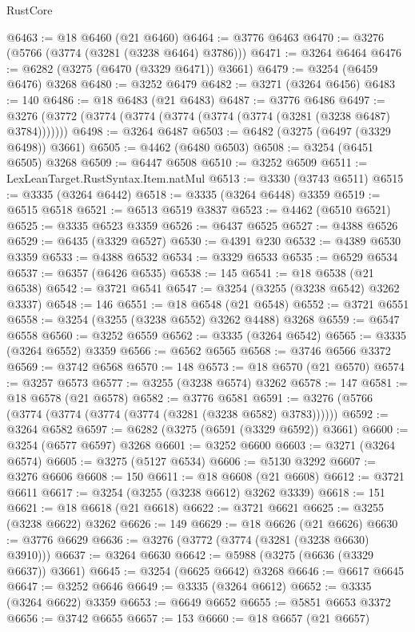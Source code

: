 \begin{lexlean}{RustCore}
\begin{coremodule}
@6463 := @18 @6460 (@21 @6460)
@6464 := @3776 @6463
@6470 := @3276 (@5766 (@3774 (@3281 (@3238 @6464) @3786)))
@6471 := @3264 @6464
@6476 := @6282 (@3275 (@6470 (@3329 @6471)) @3661)
@6479 := @3254 (@6459 @6476) @3268
@6480 := @3252 @6479
@6482 := @3271 (@3264 @6456)
@6483 := 140
@6486 := @18 @6483 (@21 @6483)
@6487 := @3776 @6486
@6497 := @3276 (@3772 (@3774 (@3774 (@3774 (@3774 (@3774 (@3281 (@3238 @6487) @3784)))))))
@6498 := @3264 @6487
@6503 := @6482 (@3275 (@6497 (@3329 @6498)) @3661)
@6505 := @4462 (@6480 @6503)
@6508 := @3254 (@6451 @6505) @3268
@6509 := @6447 @6508
@6510 := @3252 @6509
@6511 := LexLeanTarget.RustSyntax.Item.natMul
@6513 := @3330 (@3743 @6511)
@6515 := @3335 (@3264 @6442)
@6518 := @3335 (@3264 @6448) @3359
@6519 := @6515 @6518
@6521 := @6513 @6519 @3837
@6523 := @4462 (@6510 @6521)
@6525 := @3335 @6523 @3359
@6526 := @6437 @6525
@6527 := @4388 @6526
@6529 := @6435 (@3329 @6527)
@6530 := @4391 @230
@6532 := @4389 @6530 @3359
@6533 := @4388 @6532
@6534 := @3329 @6533
@6535 := @6529 @6534
@6537 := @6357 (@6426 @6535)
@6538 := 145
@6541 := @18 @6538 (@21 @6538)
@6542 := @3721 @6541
@6547 := @3254 (@3255 (@3238 @6542) @3262 @3337)
@6548 := 146
@6551 := @18 @6548 (@21 @6548)
@6552 := @3721 @6551
@6558 := @3254 (@3255 (@3238 @6552) @3262 @4488) @3268
@6559 := @6547 @6558
@6560 := @3252 @6559
@6562 := @3335 (@3264 @6542)
@6565 := @3335 (@3264 @6552) @3359
@6566 := @6562 @6565
@6568 := @3746 @6566 @3372
@6569 := @3742 @6568
@6570 := 148
@6573 := @18 @6570 (@21 @6570)
@6574 := @3257 @6573
@6577 := @3255 (@3238 @6574) @3262
@6578 := 147
@6581 := @18 @6578 (@21 @6578)
@6582 := @3776 @6581
@6591 := @3276 (@5766 (@3774 (@3774 (@3774 (@3774 (@3281 (@3238 @6582) @3783))))))
@6592 := @3264 @6582
@6597 := @6282 (@3275 (@6591 (@3329 @6592)) @3661)
@6600 := @3254 (@6577 @6597) @3268
@6601 := @3252 @6600
@6603 := @3271 (@3264 @6574)
@6605 := @3275 (@5127 @6534)
@6606 := @5130 @3292
@6607 := @3276 @6606
@6608 := 150
@6611 := @18 @6608 (@21 @6608)
@6612 := @3721 @6611
@6617 := @3254 (@3255 (@3238 @6612) @3262 @3339)
@6618 := 151
@6621 := @18 @6618 (@21 @6618)
@6622 := @3721 @6621
@6625 := @3255 (@3238 @6622) @3262
@6626 := 149
@6629 := @18 @6626 (@21 @6626)
@6630 := @3776 @6629
@6636 := @3276 (@3772 (@3774 (@3281 (@3238 @6630) @3910)))
@6637 := @3264 @6630
@6642 := @5988 (@3275 (@6636 (@3329 @6637)) @3661)
@6645 := @3254 (@6625 @6642) @3268
@6646 := @6617 @6645
@6647 := @3252 @6646
@6649 := @3335 (@3264 @6612)
@6652 := @3335 (@3264 @6622) @3359
@6653 := @6649 @6652
@6655 := @5851 @6653 @3372
@6656 := @3742 @6655
@6657 := 153
@6660 := @18 @6657 (@21 @6657)

\end{coremodule}
\end{lexlean}
